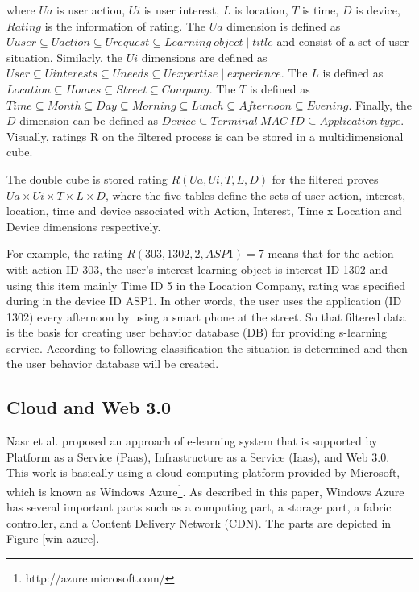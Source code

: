 \documentclass[journal]{vgtc}
\begin{document}
  where $Ua$ is user action, $Ui$ is user interest, $L$ is location, $T$ is time, $D$ is device, $Rating$ is the  information of rating. The $Ua$ dimension is defined as $Uuser \subseteq Uaction \subseteq Urequest \subseteq Learning\ object \mid title$ and consist of a set of user situation. Similarly, the $Ui$ dimensions are defined as $User \subseteq U interests \subseteq U needs \subseteq U expertise \mid experience$. The $L$ is defined as $Location \subseteq Homes \subseteq Street \subseteq Company$. The $T$ is defined as $Time \subseteq Month \subseteq Day \subseteq Morning \subseteq Lunch \subseteq Afternoon \subseteq Evening$. Finally, the $D$ dimension can be defined as $Device \subseteq Terminal\ MAC\ ID \subseteq Application\ type$. Visually, ratings R on the filtered process is can be stored in a multidimensional cube.


  The double cube is stored rating $R(Ua, Ui, T, L, D)$ for the filtered proves $Ua \times Ui \times T \times L \times D$, where the five tables define the sets of user action, interest, location, time and device associated with Action, Interest, Time x Location and Device dimensions respectively.

  For example, the rating $R(303,1302,2,ASP1)=7$ means that for the action with action ID 303, the user's interest learning object is interest ID 1302 and using this item mainly Time ID 5 in the Location Company, rating was specified during in the device ID ASP1. In other words, the user uses the application (ID 1302) every afternoon by using a smart phone at the street. So that filtered data is the basis for creating user behavior database (DB) for providing s-learning service. According to following classification the situation is determined and then the user behavior database will be created.

  
  \subsection{Cloud and Web 3.0}
  Nasr et al. \cite{nasr2012proposed} proposed an approach of e-learning system that is supported by Platform as a Service (Paas), Infrastructure as a Service (Iaas), and Web 3.0. This work is basically using a cloud computing platform provided by Microsoft, which is known as Windows Azure\footnote{http://azure.microsoft.com/}. As described in this paper, Windows Azure has several important parts such as a computing part, a storage part, a fabric controller, and a Content Delivery Network (CDN). The parts are depicted in Figure \ref{win-azure}.
\end{document}
